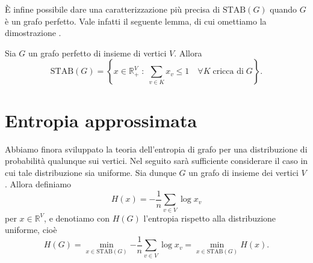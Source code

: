 È infine possibile dare una caratterizzazione più precisa di \(\text{STAB}(G)\) quando \(G\) è un grafo perfetto. Vale infatti il seguente lemma, di cui omettiamo la dimostrazione \cite{Chvatal1975}.

\begin{lemma}
	[Chvatál] \label{chvatallemma} Sia \(G\) un grafo perfetto di insieme di vertici \(V\). Allora
	\[
	  \text{STAB}(G) = \left\{x\in \mathbb{R}_{+}^V\;:\;\sum_{v\in K}{x_v}\le 1\quad \forall K\;\text{cricca di}\;G\right\}\text{.}
	\]
\end{lemma}

\section{Entropia approssimata}

Abbiamo finora sviluppato la teoria dell'entropia di grafo per una distribuzione di probabilità qualunque sui vertici. Nel seguito sarà sufficiente considerare il caso in cui tale distribuzione sia uniforme. Sia dunque \(G\) un grafo di insieme dei vertici \(V\). Allora definiamo
\[
  H(x) = -\frac{1}{n}\sum_{v\in V}{\log{x_v}}
\]
per \(x\in\mathbb{R}^V\), e denotiamo con \(H(G)\) l'entropia rispetto alla distribuzione uniforme, cioè
\[
  H(G) = \min_{x\in \text{STAB}(G)}{-\frac{1}{n}\sum_{v\in V}{\log{x_v}}} = \min_{x\in \text{STAB}(G)}{H(x)}\text{.}
\]

